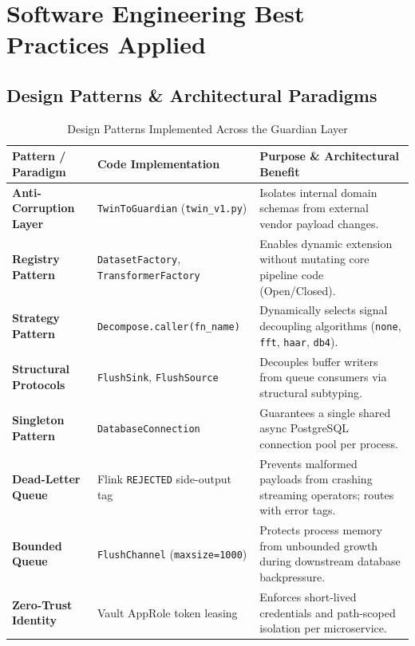 \documentclass[10pt,a4paper]{report}
\begin{document}
\chapter{Software Engineering Best Practices Applied}

\section{Design Patterns \& Architectural Paradigms}
\begin{table}[htbp]
\centering
\small
\caption{Design Patterns Implemented Across the Guardian Layer}
\label{tab:design_patterns}
\begin{tabularx}{\textwidth}{llX}
\toprule
\textbf{Pattern / Paradigm} & \textbf{Code Implementation} & \textbf{Purpose \& Architectural Benefit} \\
\midrule
\textbf{Anti-Corruption Layer} & \texttt{TwinToGuardian} (\texttt{twin\_v1.py}) & Isolates internal domain schemas from external vendor payload changes. \\
\textbf{Registry Pattern} & \texttt{DatasetFactory}, \texttt{TransformerFactory} & Enables dynamic extension without mutating core pipeline code (Open/Closed). \\
\textbf{Strategy Pattern} & \texttt{Decompose.caller(fn\_name)} & Dynamically selects signal decoupling algorithms (\texttt{none}, \texttt{fft}, \texttt{haar}, \texttt{db4}). \\
\textbf{Structural Protocols} & \texttt{FlushSink}, \texttt{FlushSource} & Decouples buffer writers from queue consumers via structural subtyping. \\
\textbf{Singleton Pattern} & \texttt{DatabaseConnection} & Guarantees a single shared async PostgreSQL connection pool per process. \\
\textbf{Dead-Letter Queue} & Flink \texttt{REJECTED} side-output tag & Prevents malformed payloads from crashing streaming operators; routes with error tags. \\
\textbf{Bounded Queue} & \texttt{FlushChannel} (\texttt{maxsize=1000}) & Protects process memory from unbounded growth during downstream database backpressure. \\
\textbf{Zero-Trust Identity} & Vault AppRole token leasing & Enforces short-lived credentials and path-scoped isolation per microservice. \\
\bottomrule
\end{tabularx}
\end{table}
\end{document}
